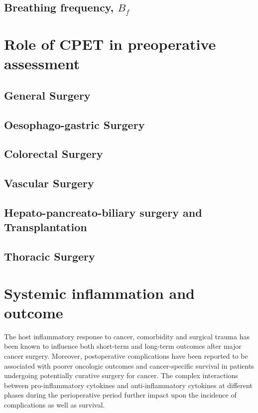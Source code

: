 \subsection{Breathing frequency, $B_f$}

\section{Role of CPET in preoperative assessment}
\subsection{General Surgery}
\subsection{Oesophago-gastric Surgery}
\subsection{Colorectal Surgery}
\subsection{Vascular Surgery}
\subsection{Hepato-pancreato-biliary surgery and Transplantation}
\subsection{Thoracic Surgery}

\clearpage

\section{Systemic inflammation and outcome}
\label{sec:intro_systemic_inflammation_outcome}


The host inflammatory response to cancer, comorbidity and surgical trauma has been known to influence both short-term and long-term outcomes after major cancer surgery. Moreover, postoperative complications have been reported to be associated with poorer oncologic outcomes and cancer-specific survival in patients undergoing potentially curative surgery for cancer. The complex interactions between pro-inflammatory cytokines and anti-inflammatory cytokines at different phases during the perioperative period further impact upon the incidence of complications as well as survival.

